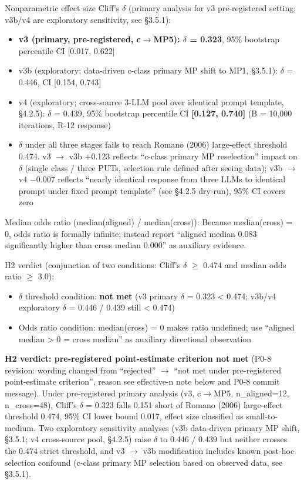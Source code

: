 \documentclass[review,12pt,authoryear]{elsarticle}
\providecommand{\tightlist}{\setlength{\itemsep}{0pt}\setlength{\parskip}{0pt}}
\begin{document}
Nonparametric effect size Cliff's $\delta$ (primary analysis for v3
pre-registered setting; v3b/v4 are exploratory sensitivity, see §3.5.1):

\begin{itemize}
\tightlist
\item
  \textbf{v3 (primary, pre-registered, c$\to$MP5): $\delta$ = 0.323}, 95\%
  bootstrap percentile CI {[}0.017, 0.622{]}
\item
  v3b (exploratory; data-driven c-class primary MP shift to MP1,
  §3.5.1): $\delta$ = 0.446, CI {[}0.154, 0.743{]}
\item
  v4 (exploratory; cross-source 3-LLM pool over identical prompt
  template, §4.2.5): $\delta$ = 0.439, 95\% bootstrap percentile CI
  \textbf{{[}0.127, 0.740{]}} (B = 10,000 iterations, R-12 response)
\item
  $\delta$ under all three stages fails to reach Romano (2006) large-effect
  threshold 0.474. v3 $\to$ v3b +0.123 reflects ``c-class primary MP
  reselection'' impact on $\delta$ (single class / three PUTs, selection rule
  defined after seeing data); v3b $\to$ v4 −0.007 reflects ``nearly
  identical response from three LLMs to identical prompt under fixed
  prompt template'' (see §4.2.5 dry-run), 95\% CI covers zero
\end{itemize}

Median odds ratio (median(aligned) / median(cross)): Because
median(cross) = 0, odds ratio is formally infinite; instead report
``aligned median 0.083 significantly higher than cross median 0.000'' as
auxiliary evidence.

H2 verdict (conjunction of two conditions: Cliff's $\delta$ $\geq$ 0.474 and median
odds ratio $\geq$ 3.0):

\begin{itemize}
\tightlist
\item
  $\delta$ threshold condition: \textbf{not met} (v3 primary $\delta$ = 0.323
  \textless{} 0.474; v3b/v4 exploratory $\delta$ = 0.446 / 0.439 still
  \textless{} 0.474)
\item
  Odds ratio condition: median(cross) = 0 makes ratio undefined; use
  ``aligned median \textgreater{} 0 = cross median'' as auxiliary
  directional observation
\end{itemize}

\textbf{H2 verdict: pre-registered point-estimate criterion not met}
(P0-8 revision: wording changed from ``rejected'' $\to$ ``not met under
pre-registered point-estimate criterion'', reason see effective-n note
below and P0-8 commit message). Under pre-registered primary analysis
(v3, c$\to$MP5, n\_aligned=12, n\_cross=48), Cliff's $\delta$ = 0.323 falls 0.151
short of Romano (2006) large-effect threshold 0.474, 95\% CI lower bound
0.017, effect size classified as small-to-medium. Two exploratory
sensitivity analyses (v3b data-driven primary MP shift, §3.5.1; v4
cross-source pool, §4.2.5) raise $\delta$ to 0.446 / 0.439 but neither crosses
the 0.474 strict threshold, and v3 $\to$ v3b modification includes known
post-hoc selection confound (c-class primary MP selection based on
observed data, see §3.5.1).
\end{document}
